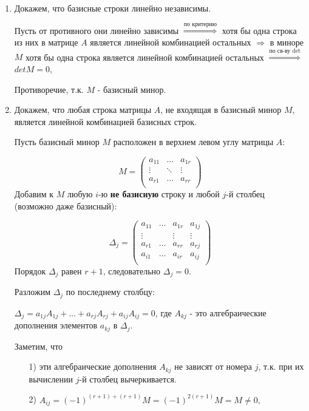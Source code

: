 \begin{enumerate}
    \item Докажем, что базисные строки линейно независимы.
    
    Пусть от противного они линейно зависимы $\overset{\text{по критерию}}{\Rightarrow}$ хотя бы одна строка из них в матрице $A$ является линейной комбинацией остальных $\Rightarrow$ в миноре $M$ хотя бы одна строка является линейной комбинацией остальных $\overset{\text{по св-ву det}}{\Rightarrow}$ $detM = 0$,
    
    Противоречие, т.к. $M$ - базисный минор.

    \item Докажем, что любая строка матрицы $A$, не входящая в базисный минор $M$, является линейной комбинацией базисных строк.

    Пусть базисный минор $M$ расположен в верхнем левом углу матрицы $A$:
    
    $$
    M = 
    \begin{pmatrix}
        a_{11}&\ldots&a_{1r}\\
        \vdots&\ddots&\vdots\\
        a_{r1}&\ldots&a_{rr}\\
    \end{pmatrix}
    $$
    Добавим к $M$ любую $i$-ю {\bf {не базисную}} строку и любой $j$-й столбец (возможно даже базисный):
    
    $$
    \Delta_j = 
    \begin{pmatrix}
        a_{11}&\ldots&a_{1r}&a_{1j}\\
        \vdots&&\vdots&\vdots\\
        a_{r1}&\ldots&a_{rr}&a_{rj}\\
        a_{i1}&\ldots&a_{ir}&a_{ij}\\
    \end{pmatrix}
    $$
Порядок $\Delta_j$ равен $r + 1$, следовательно $\Delta_j = 0.$

Разложим $\Delta_j$ по последнему столбцу:

$\Delta_j = a_{1j}A_{1j} + ... + a_{rj}A_{rj} + a_{ij}A_{ij} = 0$, где $A_{kj}$ - это алгебраические дополнения элементов $a_{kj}$ в $\Delta_j$.

Заметим, что
\begin{enumerate}
    \item[1)] эти алгебраические дополнения $A_{kj}$ не зависят от номера $j$, т.к. при их вычислении $j$-й столбец вычеркивается.
    \item[2)] $A_{ij} = (-1)^{(r + 1) + (r + 1)}M = (-1)^{2(r + 1)}M = M \ne 0,$
\end{enumerate}


\end{enumerate}

